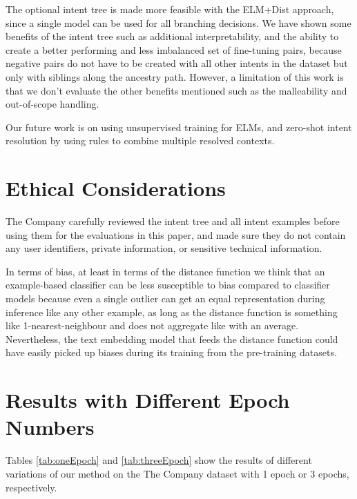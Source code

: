\documentclass[sigconf, anonymous=true]{acmart}
\begin{document}
The optional intent tree is made more feasible with the ELM+Dist approach, since a single model can be used for all branching decisions. We have shown some benefits of the intent tree such as additional interpretability, and the ability to create a better performing and less imbalanced set of fine-tuning pairs, because negative pairs do not have to be created with all other intents in the dataset but only with siblings along the ancestry path. However, a limitation of this work is that we don't evaluate the other benefits mentioned such as the malleability and out-of-scope handling.

Our future work is on using unsupervised training for ELMs, and zero-shot intent resolution by using rules to combine multiple resolved contexts. 

\section{Ethical Considerations}
The Company carefully reviewed the intent tree and all intent examples before using them for the evaluations in this paper, and made sure they do not contain any user identifiers, private information, or sensitive technical information. 

In terms of bias, at least in terms of the distance function we think that an example-based classifier can be less susceptible to bias compared to classifier models because even a single outlier can get an equal representation during inference like any other example, as long as the distance function is something like 1-nearest-neighbour and does not aggregate like with an average. Nevertheless, the text embedding model that feeds the distance function could have easily picked up biases during its training from the pre-training datasets. 





\appendix

\section{Results with Different Epoch Numbers}
\label{sec:Epochs}

Tables \ref{tab:oneEpoch} and \ref{tab:threeEpoch} show the results of different variations of our method on the The Company dataset with 1 epoch or 3 epochs, respectively.
\end{document}

